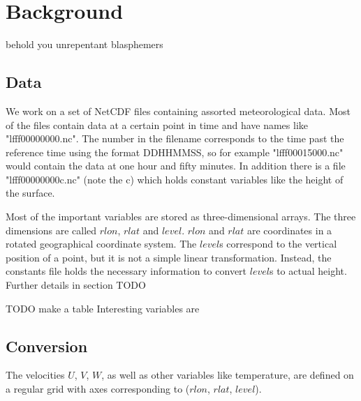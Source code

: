 \setcounter{chapter}{1}

\chapter{Background}

behold you unrepentant blasphemers

\section{Data}
We work on a set of NetCDF files containing assorted meteorological data. Most of the files contain data at a certain point in time and have names like "lfff00000000.nc". The number in the filename corresponds to the time past the reference time using the format DDHHMMSS, so for example "lfff00015000.nc" would contain the data at one hour and fifty minutes. In addition there is a file "lfff00000000c.nc" (note the c) which holds constant variables like the height of the surface.

Most of the important variables are stored as three-dimensional arrays. The three dimensions are called $rlon$, $rlat$ and $level$. $rlon$ and $rlat$ are coordinates in a rotated geographical coordinate system. The $level$s correspond to the vertical position of a point, but it is not a simple linear transformation. Instead, the constants file holds the necessary information to convert $level$s to actual height. Further details in section TODO

TODO make a table
Interesting variables are


\section{Conversion}
The velocities $U$, $V$, $W$, as well as other variables like temperature, are defined on a regular grid with axes corresponding to ($rlon$, $rlat$, $level$). 


